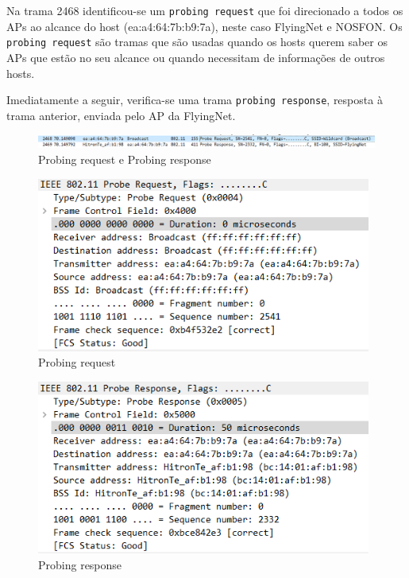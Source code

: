 \documentclass{llncs}
\begin{document}
Na trama 2468 identificou-se um \texttt{probing request} que foi direcionado a todos os APs ao alcance do host (ea:a4:64:7b:b9:7a), neste caso FlyingNet e NOSFON. Os \texttt{probing request} são tramas que são usadas quando os hosts querem saber os APs que estão no seu alcance ou quando necessitam de informações de outros hosts.

Imediatamente a seguir, verifica-se uma trama \texttt{probing response}, resposta à trama anterior, enviada pelo AP da FlyingNet.

\begin{figure}[H]
\begin{center}
\includegraphics[width=13cm]{11.PNG}
\end{center}
\caption{Probing request e Probing response}
\end{figure}

\begin{figure}[H]
\begin{center}
\includegraphics[width=11cm]{11request.PNG}
\end{center}
\caption{Probing request}
\end{figure}

\begin{figure}[H]
\begin{center}
\includegraphics[width=11cm]{11response.PNG}
\end{center}
\caption{Probing response}
\end{figure}
\end{document}
